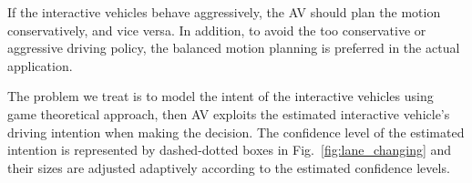 \documentclass[10pt,journal]{IEEEtran}
\begin{document}
	
	If the interactive vehicles behave aggressively, the AV should plan the motion conservatively, and vice versa. In addition, to avoid the too conservative or aggressive driving policy, the balanced motion planning is preferred in the actual application.
	
	The problem we treat is to model the intent of the interactive vehicles using game theoretical approach, then AV exploits the estimated interactive vehicle's driving intention when making the decision. The confidence level of the estimated intention is represented by dashed-dotted boxes in Fig.~\ref{fig:lane_changing} and their sizes are adjusted adaptively according to the estimated confidence levels.

	\begin{figure}
		\begin{centering}
\end{centering}
\end{figure}
\end{document}
